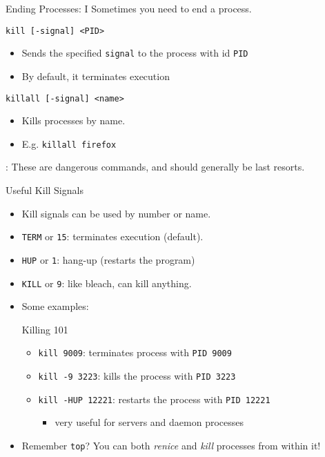 \begin{frame}[fragile]{Ending Processes: I}
  Sometimes you need to end a process.
  \begin{block}{}
    \texttt{kill [-signal] <PID>}
    \begin{itemize}
      \item Sends the specified \texttt{signal} to the process with id \texttt{PID}
      \item By default, it terminates execution
    \end{itemize}
  \end{block}
  \begin{block}{}
    \texttt{killall [-signal] <name>}
    \begin{itemize}
      \item Kills processes by name.
      \item E.g. \texttt{killall firefox}
    \end{itemize}
  \end{block}
  : These are dangerous commands, and should generally be last resorts.
\end{frame}

\begin{frame}[fragile]{Useful Kill Signals}
  \begin{itemize}[<+- | alert@+>]
    \item Kill signals can be used by number or name.
    \item \texttt{TERM} or \texttt{15}: terminates execution (default).
    \item \texttt{HUP} or \texttt{1}: hang-up (restarts the program)
    \item \texttt{KILL} or \texttt{9}: like bleach, can kill anything.
    \item Some examples:
    \begin{block}{Killing 101}
      \begin{itemize}
        \item \texttt{kill 9009}: terminates process with \texttt{PID 9009}
        \item \texttt{kill -9 3223}:  kills the process with \texttt{PID 3223}
        \item \texttt{kill -HUP 12221}: restarts the process with \texttt{PID 12221}
        \begin{itemize}
          \item very useful for servers and daemon processes
        \end{itemize}
      \end{itemize}
    \end{block}
    \item Remember \texttt{top}? You can both \emph{renice} and \emph{kill} processes from within it!
  \end{itemize}
\end{frame}

